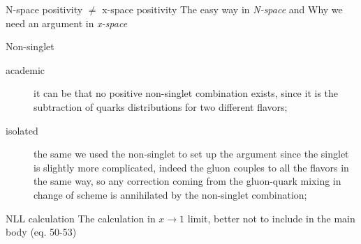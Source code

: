 \documentclass[9pt]{beamer}
\begin{document}
\begin{frame}{N-space positivity $\neq$ x-space positivity}
    The easy way in \textit{N-space} and Why we need an argument in \textit{x-space}
\end{frame}

\begin{frame}{Non-singlet}
    \begin{description}
        \item[academic] it can be that no positive non-singlet combination
            exists, since it is the subtraction of quarks distributions for two
            different flavors;
        \item[isolated] the same we used the non-singlet to set up the argument
            since the singlet is slightly more complicated, indeed the gluon
            couples to all the flavors in the same way, so any correction
            coming from the gluon-quark mixing in change of scheme is
            annihilated by the non-singlet combination;
    \end{description}
\end{frame}

\begin{frame}{NLL calculation}
    The calculation in $x \to 1$ limit, better not to include in the main body (eq. 50-53)
\end{frame}
\end{document}
